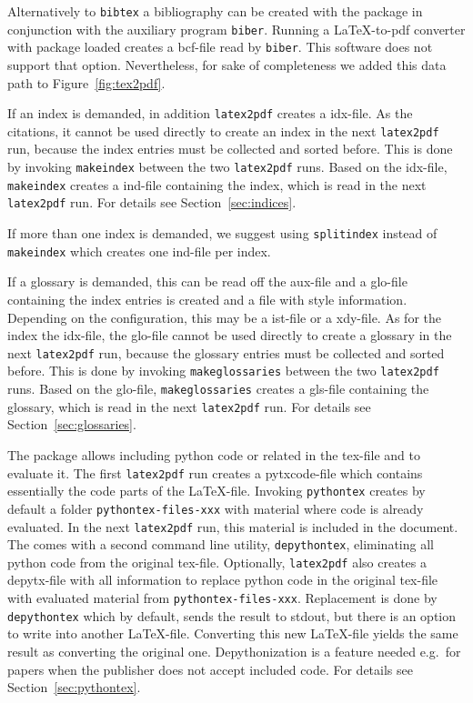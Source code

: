Alternatively to \texttt{bibtex} a bibliography can be created 
with the package  in conjunction with the auxiliary program \texttt{biber}. 
Running a \LaTeX-to-pdf converter with package  loaded 
creates a \gls{bcf}-file read by \texttt{biber}. 
This software does not support that option. 
Nevertheless, for sake of completeness we added this data path to Figure~\ref{fig:tex2pdf}. 

If an index is demanded, 
in addition \texttt{latex2pdf} creates a \gls{idx}-file. 
As the citations, it cannot be used directly to create an index in
the next \texttt{latex2pdf} run, 
because the index entries must be collected and sorted before. 
This is done by invoking \texttt{makeindex} 
between the two \texttt{latex2pdf} runs. 
Based on the \gls{idx}-file, \texttt{makeindex} creates a \gls{ind}-file 
containing the index, which is read in the next \texttt{latex2pdf} run. 
For details see Section~\ref{sec:indices}. 

If more than one index is demanded, 
we suggest using \texttt{splitindex} instead of \texttt{makeindex} 
which creates one \gls{ind}-file per index. 

If a glossary is demanded, this can be read off the \gls{aux}-file 
and a \gls{glo}-file containing the index entries 
is created and a file with style information. 
Depending on the configuration, 
this may be a \gls{ist}-file or a \gls{xdy}-file. 
As for the index the \gls{idx}-file, 
the \gls{glo}-file cannot be used directly to create a glossary in
the next \texttt{latex2pdf} run, 
because the glossary entries must be collected and sorted before. 
This is done by invoking \texttt{makeglossaries} 
between the two \texttt{latex2pdf} runs. 
Based on the \gls{glo}-file, \texttt{makeglossaries} creates a \gls{gls}-file 
containing the glossary, which is read in the next \texttt{latex2pdf} run. 
For details see Section~\ref{sec:glossaries}. 

The package  allows including python code or related 
in the \gls{tex}-file and to evaluate it. 
The first \texttt{latex2pdf} run creates a \gls{pytxcode}-file 
which contains essentially the code parts of the \LaTeX-file. 
Invoking \texttt{pythontex} creates by default 
a folder \texttt{pythontex-files-xxx} 
with material where code is already evaluated. 
In the next \texttt{latex2pdf} run, this material is included in the document. 
The  comes with a second command line utility, 
\texttt{depythontex}, eliminating all python code from the original tex-file. 
Optionally, \texttt{latex2pdf} also creates a \gls{depytx}-file 
with all information to replace python code in the original tex-file 
with evaluated material from \texttt{pythontex-files-xxx}. 
Replacement is done by \texttt{depythontex} 
which by default, sends the result to stdout, 
but there is an option to write into another \LaTeX-file. 
Converting this new \LaTeX-file 
yields the same result as converting the original one. 
Depythonization is a feature needed e.g.~for papers 
when the publisher does not accept included code. 
For details see Section~\ref{sec:pythontex}. 

